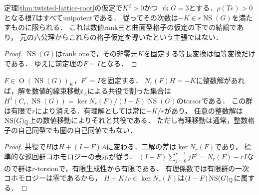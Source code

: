 \documentclass[11pt,a4paper]{ltjsarticle}
\begin{document}
\begin{corollary}[数値rank三では正規化が自動的]\label{cor:rank-three-normalized}
定理\ref{thm:twisted-lattice-root}の仮定で$K^2>0$かつ
$\operatorname{rk}G=3$とする．$\rho(Te)>0$となる根$T$はすべてunipotentである．
従ってその次数は$-K\in r\operatorname{NS}(G)$を満たすものに限られる．
これは数値rank三と曲面型格子の仮定の下での結論であり，
元の六公理からこれらの格子仮定を導いたという主張ではない．
\end{corollary}
\begin{proof}
$\operatorname{NS}(G)$はrank oneで，その非零元$K$を固定する等長変換は恒等変換だけである．
ゆえに前定理の$F=I$となる．
\end{proof}

\begin{proposition}[固定した数値自己同型と巡回障害]\label{prop:numerical-root-cohomology}
$F\in\operatorname{O}(\operatorname{NS}(G))_K$，$F^r=I$を固定する．
$N_r(F)H=-K$に整数解があれば，解を数値的線束移動$t_A$による共役で割った集合は
$H^1(C_r,\operatorname{NS}(G))=\ker N_r(F)/(I-F)\operatorname{NS}(G)$のtorsorである．
この群は有限で$r$により消える．有理解としては常に$-K/r$があり，
任意の整数解は$\operatorname{NS}(G)_{\mathbb Q}$上の数値移動によりそれと共役である．
ただし有理移動は通常，整数格子の自己同型でも圏の自己同値でもない．
\end{proposition}
\begin{proof}
共役で$H$は$H+(I-F)A$に変わる．二解の差は$\ker N_r(F)$であり，
標準的な巡回群コホモロジーの表示が従う．
$(I-F)\sum_{j=0}^{r-1}jF^j=N_r(F)-rI$なので群は$r$-torsionで，有限生成性から有限である．
有理係数では有限群の一次コホモロジーは零であるから，
$H+K/r\in\ker N_r(F)$は$(I-F)\operatorname{NS}(G)_{\mathbb Q}$に属する．
\end{proof}
\end{document}

